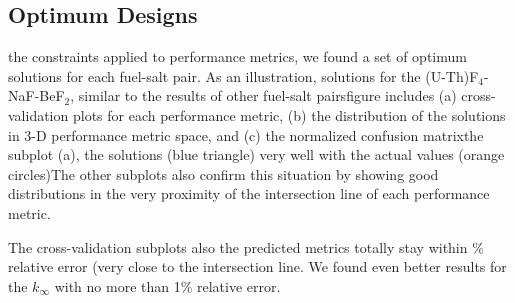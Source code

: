 \subsection{Optimum Designs}
\DIFdelbegin {}\DIFdelend \DIFaddbegin

    \DIFaddend the constraints applied to \DIFdelbegin {}\DIFdelend performance metrics, we found a set of optimum solutions for each fuel-salt pair. As an illustration, \DIFdelbegin {}\DIFdelend \DIFaddbegin {}\DIFaddend solutions for the (U-Th)F$_4$-NaF-BeF$_2$, \DIFaddbegin {}\DIFaddend similar to the results of other fuel-salt pairs\DIFdelbegin {}\DIFdelend \DIFaddbegin {}\DIFaddend figure includes (a) \DIFdelbegin {}\DIFdelend cross-validation plots for each performance metric, (b) the distribution of the \DIFdelbegin {}\DIFdelend \DIFaddbegin {}\DIFaddend solutions in 3-D performance metric space, and (c) the normalized confusion matrix\DIFdelbegin {}\DIFdelend \DIFaddbegin {}\DIFaddend the subplot (a), the \DIFdelbegin {}\DIFdelend \DIFaddbegin {}\DIFaddend solutions (blue triangle) \DIFdelbegin {}\DIFdelend \DIFaddbegin {}\DIFaddend very well with the actual values (orange circles)\DIFdelbegin {}\DIFdelend \DIFaddbegin {}\DIFaddend The other subplots also confirm this situation by showing good distributions in the very proximity of the intersection line of each performance metric.

    The cross-validation subplots also \DIFdelbegin {}\DIFdelend \DIFaddbegin {}\DIFaddend the predicted metrics totally stay within \DIFaddbegin {}\% relative error (\DIFdelbegin {}\DIFdelend \DIFaddbegin {}\DIFaddend very close to the intersection line. We found even better results for the $k_{\infty}$ \DIFaddbegin {}\DIFaddend with no more than 1\% relative error.

